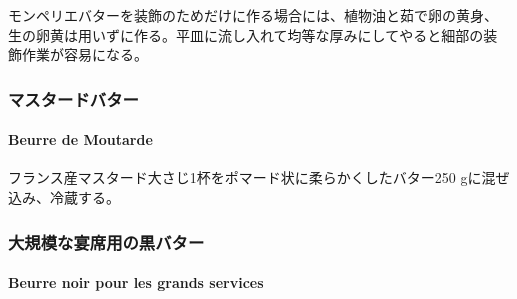 \begin{recette}

モンペリエバターを装飾のためだけに作る場合には、植物油と茹で卵の黄身、
生の卵黄は用いずに作る。平皿に流し入れて均等な厚みにしてやると細部の装
飾作業が容易になる。

\maeaki

\hypertarget{ux30deux30b9ux30bfux30fcux30c9ux30d0ux30bfux30fc}{%
\subsubsection{マスタードバター}\label{ux30deux30b9ux30bfux30fcux30c9ux30d0ux30bfux30fc}}

\hypertarget{beurre-de-moutarde}{%
\paragraph{Beurre de Moutarde}\label{beurre-de-moutarde}}


フランス産マスタード大さじ1\undemi{}杯をポマード状に柔らかくしたバター250
gに混ぜ込み、冷蔵する。

\maeaki

\hypertarget{ux5927ux898fux6a21ux306aux5bb4ux5e2dux7528ux306eux9ed2ux30d0ux30bfux30fc}{%
\subsubsection{大規模な宴席用の黒バター}\label{ux5927ux898fux6a21ux306aux5bb4ux5e2dux7528ux306eux9ed2ux30d0ux30bfux30fc}}

\hypertarget{beurre-noir-pour-les-grands-services}{%
\paragraph{Beurre noir pour les grands
services}\label{beurre-noir-pour-les-grands-services}}


\end{recette}

